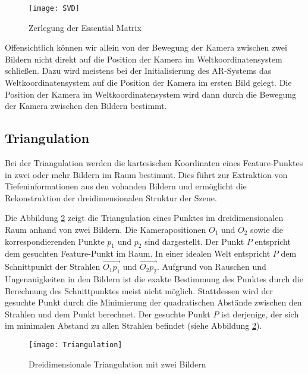 \begin{figure}
    \centering
    \texttt{[image: SVD]}
    \caption{Zerlegung der Essential Matrix\label{fig:SVD}}\par
\end{figure}

Offensichtlich können wir allein von der Bewegung der Kamera zwischen zwei Bildern nicht direkt auf die Position der Kamera im Weltkoordinatensystem schließen. Dazu wird meistens bei der Initialisierung des AR-Systems das Weltkoordinatensystem auf die Position der Kamera im ersten Bild gelegt. Die Position der Kamera im Weltkoordinatensystem wird dann durch die Bewegung der Kamera zwischen den Bildern bestimmt. \cite{gao2021vSLAM}

\subsection{Triangulation}

Bei der Triangulation werden die kartesischen Koordinaten eines Feature-Punktes in zwei oder mehr Bildern im Raum bestimmt. Dies führt zur Extraktion von Tiefeninformationen aus den vohanden Bildern und ermöglicht die Rekonstruktion der dreidimensionalen Struktur der Szene. 

Die Abbildung \ref{fig:Triangulation} zeigt die Triangulation eines Punktes im dreidimensionalen Raum anhand von zwei Bildern. Die Kamerapositionen \( O_1 \) und \( O_2 \) sowie die korrespondierenden Punkte \( p_1 \) und \( p_2 \) sind dargestellt. Der Punkt \( P \) entspricht dem gesuchten Feature-Punkt im Raum. In einer idealen Welt entspricht \( P \) dem Schnittpunkt der Strahlen \( \overrightarrow{O_1p_1} \) und \( \overrightarrow{O_2p_2} \). Aufgrund von Rauschen und Ungenauigkeiten in den Bildern ist die exakte Bestimmung des Punktes durch die Berechnung des Schnittpunktes meist nicht möglich. Stattdessen wird der gesuchte Punkt durch die Minimierung der quadratischen Abstände zwischen den Strahlen und dem Punkt berechnet. Der gesuchte Punkt \( P \) ist derjenige, der sich im minimalen Abstand zu allen Strahlen befindet (siehe Abbildung \ref{fig:Triangulation}). \cite{gao2021vSLAM}

\begin{figure}
    \centering
    \texttt{[image: Triangulation]}
    \caption{Dreidimensionale Triangulation mit zwei Bildern\label{fig:Triangulation}}\par
\end{figure}

